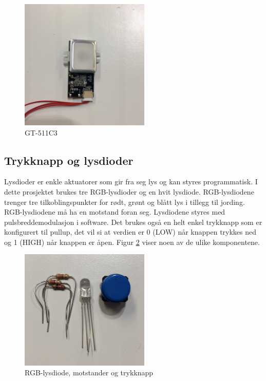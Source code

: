 \begin{figure}
\includegraphics[width=0.55\textwidth, center]{fig/prototype/fingerprintsensor}
\caption{GT-511C3}
\label{fig:gt511c3}
\end{figure}

\subsection{Trykknapp og lysdioder}
Lysdioder er enkle aktuatorer som gir fra seg lys og kan styres programmatisk. I dette prosjektet brukes tre RGB-lysdioder og en hvit lysdiode.
RGB-lysdiodene trenger tre tilkoblingspunkter
for rødt, grønt og blått lys i tillegg til jording. RGB-lysdiodene må ha en motstand foran seg. Lysdiodene styres med pulsbreddemodulasjon i software.
Det brukes også en helt enkel trykknapp som er konfigurert til pullup, det vil si at verdien er 0 (LOW) når knappen trykkes ned
og 1 (HIGH) når knappen er åpen. Figur \ref{fig:lysdioder_motstander} viser noen av de ulike komponentene.

\begin{figure}
\includegraphics[width=0.55\textwidth, center]{fig/prototype/ledmotstandknapp}
\caption{RGB-lysdiode, motstander og trykknapp}
\label{fig:lysdioder_motstander}
\end{figure}
